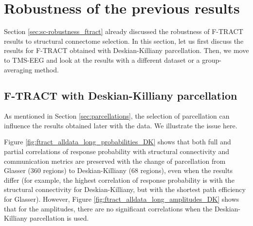 \section{Robustness of the previous results}

Section \ref{sec:sc-robustness_ftract} already discussed the robustness of F-TRACT results to structural connectome selection. In this section, let us first discuss the results for F-TRACT obtained with Deskian-Killiany parcellation. Then, we move to TMS-EEG and look at the results with a different dataset or a group-averaging method.

\subsection{F-TRACT with Deskian-Killiany parcellation}

As mentioned in Section \ref{sec:parcellations}, the selection of parcellation can influence the results obtained later with the data. We illustrate the issue here. 

Figure  \ref{fig:ftract_alldata_long_probabilities_DK} shows that both full and partial correlations of response probability with structural connectivity and communication metrics are preserved with the change of parcellation from Glasser (360 regions) to Deskian-Killiany (68 regions), even when the results differ (for example, the highest correlation of response probability is with the structural connectivity for Deskian-Killiany, but with the shortest path efficiency for Glasser). However, Figure \ref{fig:ftract_alldata_long_amplitudes_DK} shows that for the amplitudes, there are no significant correlations when the Deskian-Killiany parcellation is used.

